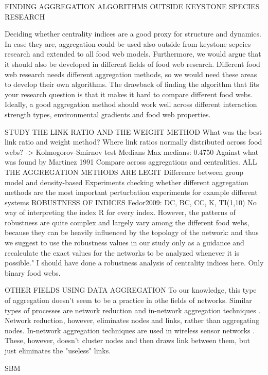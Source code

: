 FINDING AGGREGATION ALGORITHMS OUTSIDE KEYSTONE SPECIES RESEARCH
\item Deciding whether centrality indices are a good proxy for structure and dynamics. In case they are, aggregation could be used also outside from keystone sepcies research and extended to all food web models. Furthermore, we would argue that it should also be developed in different fields of food web research. Different food web research needs different aggregation methods, so we would need these areas to develop their own algorithms. The drawback of finding the algorithm that fits your research question is that it makes it hard to compare different food webs. Ideally, a good aggregation method should work well across different interaction strength types, environmental gradients and food web properties.

STUDY THE LINK RATIO AND THE WEIGHT METHOD
What was the best link ratio and weight method?
    Where link ratios normally distributed across food webs? -> Kolmogorov-Smirnov test
    Medians
    Max medians: 0.4750
    Against what was found by Martinez 1991
    Compare across aggregations and centralities.
ALL THE AGGREGATION METHODS ARE LEGIT
  Difference between group model and density-based
  Experiments checking whether different aggregation methods are the most important
  perturbation experiments for example
  different systems
ROBUSTNESS OF INDICES
  Fedor2009: DC, BC, CC, K, TI(1,10)
  No way of interpreting the index R for every index.
  However, the patterns of robustness are quite complex and largely vary among the different food webs, because they can be heavily influenced by the topology of the network: and thus we suggest to use the robustness values in our study only as a guidance and recalculate the exact values for the networks to be analyzed whenever it is possible."
  I should have done a robustness analysis of centrality indices here.
  Only binary food webs.

OTHER FIELDS USING DATA AGGREGATION
To our knowledge, this type of aggregation doesn't seem to be a practice in othe fields of networks. Similar types of processes are network reduction and in-network aggregation techniques . Network reduction, however, eliminates nodes and links, rather than aggregating nodes. In-network aggregation techniques are used in wireless sensor networks \citep{Fasolo2007}. These, however, doesn't cluster nodes and then draws link between them, but just eliminates the "useless" links.

SBM
